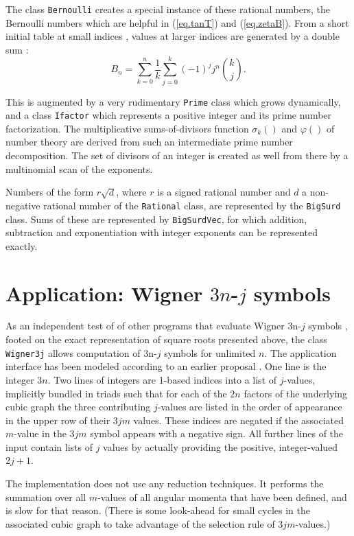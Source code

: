 \documentclass[showpacs,showkeys,amssymb,aps,twocolumn]{revtex4-1}
\begin{document}
The class \texttt{Bernoulli} creates a special instance of these
rational numbers, the Bernoulli numbers which are helpful in
(\ref{eq.tanT}) and (\ref{eq.zetaB}).
From a short initial table at small indices \cite[(Tab 23.2)]{AS},
values at larger indices are generated by a double
sum \cite[(1)]{GouldAMM79}:
\begin{equation}
B_n = \sum_{k=0}^n \frac{1}{k}\sum_{j=0}^k (-1)^j j^n \binom{k}{j}
.
\end{equation}

This is augmented by a very rudimentary \texttt{Prime}
class which grows dynamically, and a class \texttt{Ifactor}
which represents a positive integer and its prime number factorization.
The multiplicative sums-of-divisors function $\sigma_k()$ and $\varphi()$
of number theory are derived from
such an intermediate prime number decomposition. The set of divisors
of an integer is created as well from there by a multinomial scan
of the exponents.

Numbers of the form $r\sqrt d$, where $r$ is a signed rational number
and $d$ a non-negative rational number of the \texttt{Rational} class,
are represented by the \texttt{BigSurd}
class. Sums of these are represented by \texttt{BigSurdVec}, for which
addition, subtraction and exponentiation with integer exponents can
be represented exactly.

\section{Application: Wigner $3n$-$j$ symbols}
As an independent test of of other programs that evaluate Wigner 3n-$j$
symbols \cite{MatharArxiv1102a}, footed on the exact representation
of square roots presented above, the class \texttt{Wigner3j} allows
computation of 3n-$j$ symbols for unlimited $n$.
The application interface has been modeled according to an earlier
proposal \cite{BarCPC50}. One line is the integer $3n$. Two lines of integers are 1-based
indices into a list of $j$-values, implicitly bundled in triads such
that for each of the $2n$ factors of the underlying cubic graph the three
contributing $j$-values are listed in the order of appearance in the
upper row of their $3jm$ values. These indices are negated if
the associated $m$-value in the $3jm$ symbol appears with a negative
sign.
All further lines of the input contain lists of $j$ values by actually
providing the positive, integer-valued $2j+1$.

The implementation does not use any reduction techniques. It performs
the summation over all $m$-values of all angular momenta that have been
defined, and is slow for that reason. (There is some look-ahead for
small cycles in the associated cubic graph to take advantage of the
selection rule of $3jm$-values.)
\end{document}
